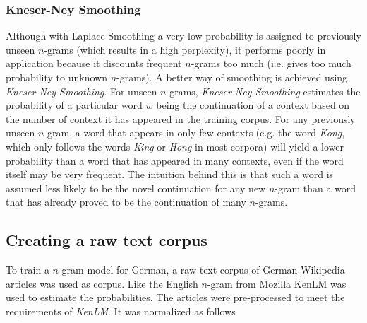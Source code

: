 \subsubsection{Kneser-Ney Smoothing}

Although with Laplace Smoothing a very low probability is assigned to previously unseen $n$-grams (which results in a high perplexity), it performs poorly in application because it discounts frequent $n$-grams too much (i.e. gives too much probability to unknown $n$-grams). A better way of smoothing is achieved using \textit{Kneser-Ney Smoothing}. For unseen $n$-grams, \textit{Kneser-Ney Smoothing} estimates the probability of a particular word $w$ being the continuation of a context based on the number of context it has appeared in the training corpus. For any previously unseen $n$-gram, a word that appears in only few contexts (e.g. the word \textit{Kong}, which only follows the words \textit{King} or \textit{Hong} in most corpora) will yield a lower probability than a word that has appeared in many contexts, even if the word itself may be very frequent. The intuition behind this is that such a word is assumed less likely to be the novel continuation for any new $n$-gram than a word that has already proved to be the continuation of many $n$-grams.

\subsection{Creating a raw text corpus}

To train a $n$-gram model for German, a raw text corpus of German Wikipedia articles was used as corpus. Like the English $n$-gram from Mozilla KenLM \parencite{kenlm} was used to estimate the probabilities. The articles were pre-processed to meet the requirements of \textit{KenLM}. It was normalized as follows 

